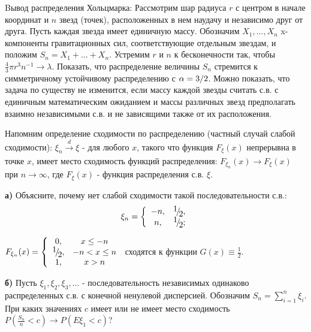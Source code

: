 \begin{problem}
Bывод распределения Хольцмарка: Рассмотрим шар радиуса $r$ с центром в начале координат и $n$ звезд (точек), расположенных в нем наудачу и независимо друг от друга. Пусть каждая звезда имеет единичную массу. Обозначим $X_{1} ,...,X_{n} $ x-компоненты гравитационных сил, соответствующие отдельным звездам, и положим $S_{n} =X_{1} +...+X_{n} $. Устремим $r$ и $n$ к бесконечности так, чтобы $\frac{4}{3} \pi r^{3} n^{-1} \to \lambda $. Показать, что распределение величины $S_{n} $ стремится к симметричному устойчивому распределению с $\alpha ={3\mathord{\left/ {\vphantom {3 2}} \right. \kern-\nulldelimiterspace} 2} $. Можно показать, что задача по существу не изменится, если массу каждой звезды считать с.в. с единичным математическим ожиданием и массы различных звезд предполагать взаимно независимыми с.в. и не зависящими также от их расположения.
\end{problem}

\begin{problem}
Напомним определение сходимости по распределению (частный случай слабой сходимости): $\xi _{n} \mathop{\to }\limits_{}^{d} \xi $ - для любого $x$, такого что функция $F_{\xi } (x)$ непрерывна в точке $x$, имеет место сходимость функций распределения: $F_{\xi _{n} } (x)\to F_{\xi } (x)$ при $n\to \infty $, где $F_{\xi } (x)$ - функция распределения с.в. $\xi $.

\noindent \textbf{а)} Объясните, почему нет слабой сходимости такой последовательности с.в.:
\[\xi _{n} =\left\{\begin{array}{cc} {-n,} & {{\raise0.7ex\hbox{$ 1 $}\!\mathord{\left/ {\vphantom {1 2}} \right. \kern-\nulldelimiterspace}\!\lower0.7ex\hbox{$ 2 $}} ,} \\ {n,} & {{\raise0.7ex\hbox{$ 1 $}\!\mathord{\left/ {\vphantom {1 2}} \right. \kern-\nulldelimiterspace}\!\lower0.7ex\hbox{$ 2 $}} ;} \end{array}\right. \] 

\begin{ordre} 

\noindent $F_{\xi _{n} } (x)=\left\{\begin{array}{cc} {0,} & {x\le -n} \\ {{\raise0.7ex\hbox{$ 1 $}\!\mathord{\left/ {\vphantom {1 2}} \right. \kern-\nulldelimiterspace}\!\lower0.7ex\hbox{$ 2 $}} ,} & {-n<x\le n} \\ {1,} & {x>n} \end{array}\right. $ сходятся к функции $G(x)\equiv \frac{1}{2} $.

\end{ordre} 

\noindent \textbf{б)} Пусть $\xi _{1} ,\xi _{2} ,\xi _{3} ,...$ - последовательность независимых одинаково распределенных с.в. с конечной ненулевой дисперсией. Обозначим $S_{n} =\sum _{i=1}^{n}\xi _{i}  $. При каких значениях $c$ имеет или не имеет место сходимость $P\left(\frac{S_{n} }{n} <c\right)\to P\left(E\xi _{1} <c\right)$?


\end{problem}

